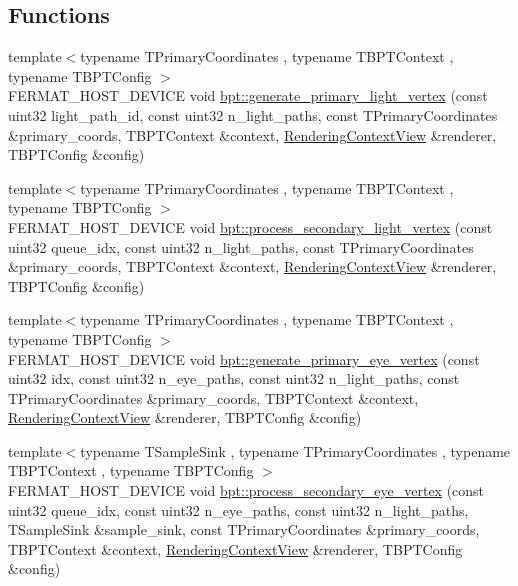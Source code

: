 \subsection*{Functions}
\begin{DoxyCompactItemize}
\item 
{\footnotesize template$<$typename T\+Primary\+Coordinates , typename T\+B\+P\+T\+Context , typename T\+B\+P\+T\+Config $>$ }\\F\+E\+R\+M\+A\+T\+\_\+\+H\+O\+S\+T\+\_\+\+D\+E\+V\+I\+CE void \hyperlink{group___b_p_t_lib_core_gaa688dca0d66d8dfeffc8d2eedfb02246}{bpt\+::generate\+\_\+primary\+\_\+light\+\_\+vertex} (const uint32 light\+\_\+path\+\_\+id, const uint32 n\+\_\+light\+\_\+paths, const T\+Primary\+Coordinates \&primary\+\_\+coords, T\+B\+P\+T\+Context \&context, \hyperlink{struct_rendering_context_view}{Rendering\+Context\+View} \&renderer, T\+B\+P\+T\+Config \&config)
\item 
{\footnotesize template$<$typename T\+Primary\+Coordinates , typename T\+B\+P\+T\+Context , typename T\+B\+P\+T\+Config $>$ }\\F\+E\+R\+M\+A\+T\+\_\+\+H\+O\+S\+T\+\_\+\+D\+E\+V\+I\+CE void \hyperlink{group___b_p_t_lib_core_ga124952cd2917df181f6aa6f39cdeda1b}{bpt\+::process\+\_\+secondary\+\_\+light\+\_\+vertex} (const uint32 queue\+\_\+idx, const uint32 n\+\_\+light\+\_\+paths, const T\+Primary\+Coordinates \&primary\+\_\+coords, T\+B\+P\+T\+Context \&context, \hyperlink{struct_rendering_context_view}{Rendering\+Context\+View} \&renderer, T\+B\+P\+T\+Config \&config)
\item 
{\footnotesize template$<$typename T\+Primary\+Coordinates , typename T\+B\+P\+T\+Context , typename T\+B\+P\+T\+Config $>$ }\\F\+E\+R\+M\+A\+T\+\_\+\+H\+O\+S\+T\+\_\+\+D\+E\+V\+I\+CE void \hyperlink{group___b_p_t_lib_core_gad13a8364b017ae28c4732ffd7eab9a65}{bpt\+::generate\+\_\+primary\+\_\+eye\+\_\+vertex} (const uint32 idx, const uint32 n\+\_\+eye\+\_\+paths, const uint32 n\+\_\+light\+\_\+paths, const T\+Primary\+Coordinates \&primary\+\_\+coords, T\+B\+P\+T\+Context \&context, \hyperlink{struct_rendering_context_view}{Rendering\+Context\+View} \&renderer, T\+B\+P\+T\+Config \&config)
\item 
{\footnotesize template$<$typename T\+Sample\+Sink , typename T\+Primary\+Coordinates , typename T\+B\+P\+T\+Context , typename T\+B\+P\+T\+Config $>$ }\\F\+E\+R\+M\+A\+T\+\_\+\+H\+O\+S\+T\+\_\+\+D\+E\+V\+I\+CE void \hyperlink{group___b_p_t_lib_core_ga560956a804364f64f0cf35d2d0c07124}{bpt\+::process\+\_\+secondary\+\_\+eye\+\_\+vertex} (const uint32 queue\+\_\+idx, const uint32 n\+\_\+eye\+\_\+paths, const uint32 n\+\_\+light\+\_\+paths, T\+Sample\+Sink \&sample\+\_\+sink, const T\+Primary\+Coordinates \&primary\+\_\+coords, T\+B\+P\+T\+Context \&context, \hyperlink{struct_rendering_context_view}{Rendering\+Context\+View} \&renderer, T\+B\+P\+T\+Config \&config)

\end{DoxyCompactItemize}
